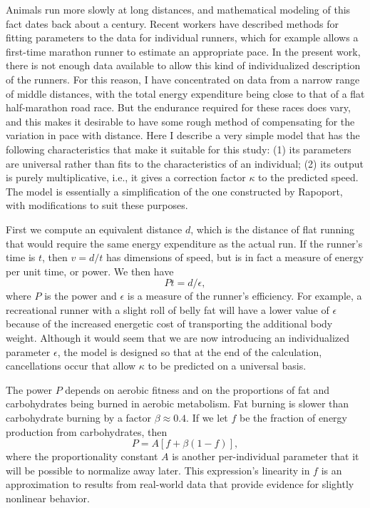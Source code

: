 \documentclass[10pt,letterpaper]{article}
\begin{document}
Animals run more slowly at long distances, and mathematical modeling of this fact dates back
about a century.\cite{hill} Recent workers have described methods for fitting parameters
to the data for individual runners,\cite{rapoport}\cite{emig} which for example allows
a first-time marathon runner to estimate an appropriate pace. In the present work, there is
not enough data available to allow this kind of individualized description of the runners.
For this reason, I have concentrated on data from a narrow range of middle distances,
with the total energy expenditure being close to that of a flat half-marathon road race.
But the endurance required for these races does vary, and this makes it desirable to have
some rough method of compensating for the variation in pace with distance. Here I describe
a very simple model that has the following characteristics that make it suitable for this
study: (1) its parameters are universal rather than fits to the characteristics of an individual;
(2) its output is purely multiplicative, i.e., it gives a correction factor $\kappa$ to the predicted speed.
The model is essentially a simplification of the one constructed by Rapoport,\cite{rapoport} with modifications
to suit these purposes.

First we compute an equivalent distance $d$, which is the distance of flat running that would
require the same energy expenditure as the actual run. If the runner's time is $t$, then
$v=d/t$ has dimensions of speed, but is in fact a measure of energy per unit time, or power.
We then have
\begin{equation}\label{eq:fuel-model-1}
  Pt=d/\epsilon,
\end{equation}
where $P$ is the power and $\epsilon$ is a measure of the runner's efficiency. For example,
a recreational runner with a slight roll of belly fat will have a lower value of $\epsilon$ because of
the increased energetic cost of transporting the additional body weight. Although it would seem that
we are now introducing an individualized parameter $\epsilon$, the model is designed so that at the
end of the calculation, cancellations occur that allow $\kappa$ to be predicted on a universal basis.

The power $P$ depends on aerobic fitness and on the proportions of fat and carbohydrates being
burned in aerobic metabolism. Fat burning is slower than carbohydrate burning by a factor $\beta\approx 0.4$.\cite{rapoport}
If we let $f$ be the fraction of energy production from carbohydrates, then
\begin{equation}\label{eq:fuel-model-2}
  P = A[f+\beta(1-f)],
\end{equation}
where the proportionality constant $A$ is another per-individual parameter that it will be
possible to normalize away later. This expression's linearity in $f$ is an approximation to
results from real-world data that provide evidence for slightly nonlinear behavior.\cite{rapoport}
\end{document}
